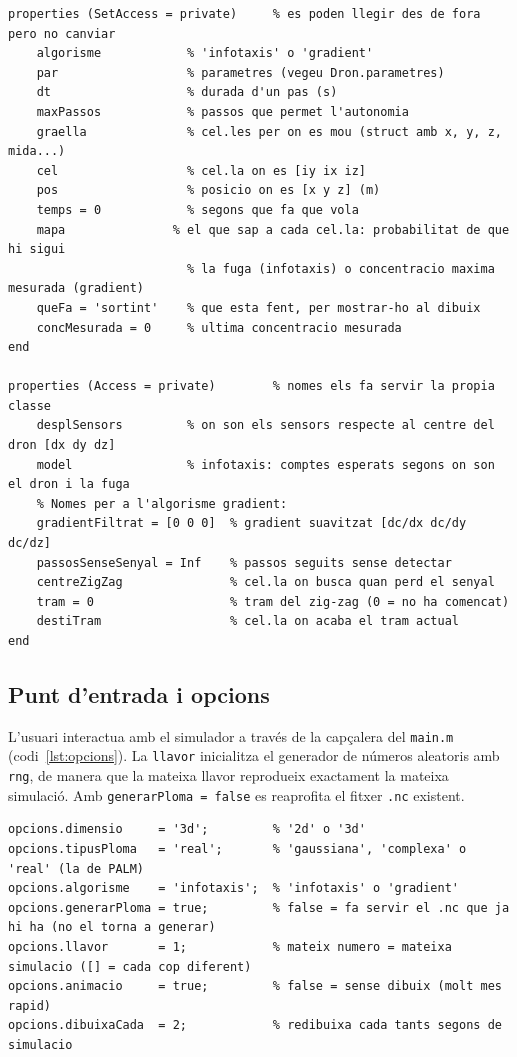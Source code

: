 \documentclass[11pt,a4paper]{article}
\begin{document}
\begin{lstlisting}[caption={Propietats de la classe \texttt{Dron} amb els seus atributs d'accés.}, label=lst:propietats]
properties (SetAccess = private)     % es poden llegir des de fora pero no canviar
    algorisme            % 'infotaxis' o 'gradient'
    par                  % parametres (vegeu Dron.parametres)
    dt                   % durada d'un pas (s)
    maxPassos            % passos que permet l'autonomia
    graella              % cel.les per on es mou (struct amb x, y, z, mida...)
    cel                  % cel.la on es [iy ix iz]
    pos                  % posicio on es [x y z] (m)
    temps = 0            % segons que fa que vola
    mapa               % el que sap a cada cel.la: probabilitat de que hi sigui
                         % la fuga (infotaxis) o concentracio maxima mesurada (gradient)
    queFa = 'sortint'    % que esta fent, per mostrar-ho al dibuix
    concMesurada = 0     % ultima concentracio mesurada
end

properties (Access = private)        % nomes els fa servir la propia classe
    desplSensors         % on son els sensors respecte al centre del dron [dx dy dz]
    model                % infotaxis: comptes esperats segons on son el dron i la fuga
    % Nomes per a l'algorisme gradient:
    gradientFiltrat = [0 0 0]  % gradient suavitzat [dc/dx dc/dy dc/dz]
    passosSenseSenyal = Inf    % passos seguits sense detectar
    centreZigZag               % cel.la on busca quan perd el senyal
    tram = 0                   % tram del zig-zag (0 = no ha comencat)
    destiTram                  % cel.la on acaba el tram actual
end
\end{lstlisting}

\subsection{Punt d'entrada i opcions}

L'usuari interactua amb el simulador a través de la capçalera del \texttt{main.m} (codi~\ref{lst:opcions}). La \texttt{llavor} inicialitza el generador de números aleatoris amb \texttt{rng}, de manera que la mateixa llavor reprodueix exactament la mateixa simulació. Amb \texttt{generarPloma = false} es reaprofita el fitxer \texttt{.nc} existent.

\begin{lstlisting}[caption={Opcions del \texttt{main.m}.}, label=lst:opcions]
%% ============================== OPCIONS ==============================
opcions.dimensio     = '3d';         % '2d' o '3d'
opcions.tipusPloma   = 'real';       % 'gaussiana', 'complexa' o 'real' (la de PALM)
opcions.algorisme    = 'infotaxis';  % 'infotaxis' o 'gradient'
opcions.generarPloma = true;         % false = fa servir el .nc que ja hi ha (no el torna a generar)
opcions.llavor       = 1;            % mateix numero = mateixa simulacio ([] = cada cop diferent)
opcions.animacio     = true;         % false = sense dibuix (molt mes rapid)
opcions.dibuixaCada  = 2;            % redibuixa cada tants segons de simulacio
\end{lstlisting}
\end{document}
